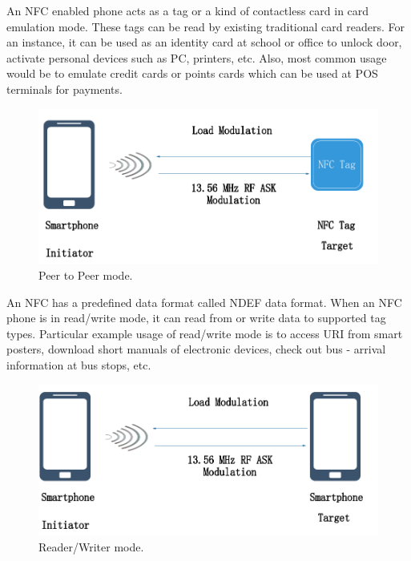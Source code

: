 \documentclass[journal]{IEEEtran}
\begin{document}
An NFC enabled phone acts as a tag or a kind of contactless card in card emulation mode. These tags can be read by existing traditional card readers. For an instance, it can be used as an identity card at school or office to unlock door, activate personal devices such as PC, printers, etc. Also, most
common usage would be to emulate credit cards or points cards which can be used at POS terminals for
payments.

\begin{figure}[htbp]
\centerline{\includegraphics[scale=0.25]{Reader_Writer_mode.png}}
\caption{Peer to Peer mode.}
\label{fig}
\end{figure}



An NFC has a predefined data format called NDEF data format. When an NFC phone is in read/write mode, it can read from or write data to supported tag types. Particular example usage of read/write mode is to access URI from smart posters, download short manuals of electronic devices, check out bus - arrival information at bus stops, etc.

\begin{figure}[htbp]
\centerline{\includegraphics[scale=0.25]{Peer-to_Peer.png}}
\caption{Reader/Writer mode.}
\label{fig}
\end{figure}
\end{document}
